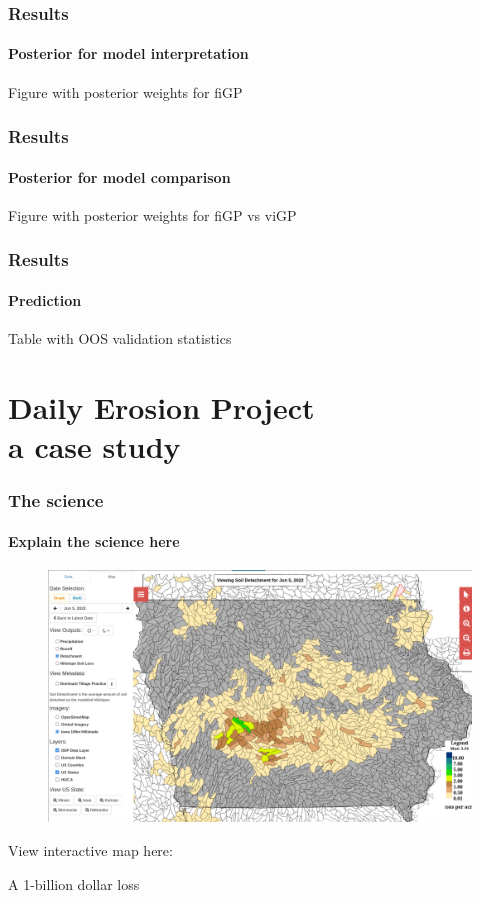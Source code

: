 \documentclass{snedecorbeamer}
\begin{document}
\begin{frame}
  \frametitle{Results}
  \framesubtitle{Posterior for model interpretation}

  Figure with posterior weights for fiGP
\end{frame}

\begin{frame}
  \frametitle{Results}
  \framesubtitle{Posterior for model comparison}

  Figure with posterior weights for fiGP vs viGP
\end{frame}

\begin{frame}
  \frametitle{Results}
  \framesubtitle{Prediction}

  Table with OOS validation statistics
\end{frame}

\section{Daily Erosion Project \\ {\small a case study}}

\begin{frame}
  \frametitle{The science}
  \framesubtitle{Explain the science here}

  \begin{figure}
    \centering
    \includegraphics[width=.6\textwidth]{inc/dep_detachment_map_20220630_1610}
  \end{figure}

  {\tiny
    View interactive map here: 
  }

  
  A 1-billion dollar loss
\end{frame}
\end{document}
